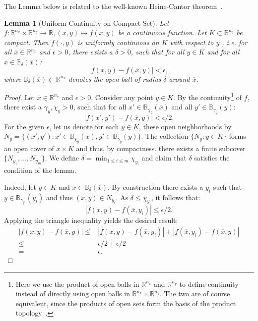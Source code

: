 \documentclass{article}
\newtheorem{lemma}{Lemma}
\newcommand{\R}{\mathbb{R}}
\newcommand{\B}{\mathbb{B}}
\begin{document}
The Lemma below is related to the well-known Heine-Cantor theorem~\citep{Heine1872Die}.
\begin{lemma}[Uniform Continuity on Compact Set]
    \label{lem:uniformcont}
    Let $f:\R^{n_x}\times \R^{n_y} \to \R, (x,y)\mapsto f(x,y)$ be a continuous function. Let $K\subset \R^{n_y}$ be compact. Then $f(\cdot,y)$ is uniformly continuous on $K$ with respect to $y$ , i.e. for all $\overline{x} \in \R^{n_x}$ and $\epsilon>0$, there exists a $\delta>0$, such that for all $y\in K$ and for all $x\in \mathbb{B}_\delta(\overline{x})$:
    \[
    |f(x,y)-f(\overline{x},y)|<\epsilon,
    \]
    where $\mathbb{B}_\delta(\overline{x})\subset \R^{n_x}$ denotes the open ball of radius $\delta$ around $\overline{x}$.
\end{lemma}
\begin{proof}
    Let $\overline{x}\in \R^{n_x}$ and $\epsilon>0$. Consider any point $y\in K$. By the continuity\footnote{Here we use the product of open balls in $\R^{n_x}$ and $\R^{n_y}$ to define continuity instead of directly using open balls in $\R^{n_x}\times \R^{n_y}$. The two are of course equivalent, since the products of open sets form the basis of the product topology~\citep{Hatcher2005Notes}.} of $f$, there exist a $\gamma_y,\chi_y>0$, such that for all $x'\in \mathbb{B}_{\chi_y}(\overline{x})$ and all $y'\in \mathbb{B}_{\gamma_y}(y)$:
    \[
        |f(x',y')-f(\overline{x},y)|<\epsilon/2.
    \]
    For the given $\epsilon$, let us denote for each $y\in K$, these open neighborhoods by $N_y= \{(x',y'): x'\in \mathbb{B}_{\chi_y}(\overline{x}), y'\in \mathbb{B}_{\gamma_y}(y)\}$. The collection $\{N_y: y\in K\}$ forms an open cover of $\overline{x} \times K$ and thus, by compactness. there exists a finite subcover $\{N_{y_1},\dots,N_{y_m}\}$. We define $\delta = \min_{1\leq i \leq m} \chi_{y_i}$ and claim that $\delta$ satisfies the condition of the lemma.

    Indeed, let $y\in K$ and $x\in \mathbb{B}_\delta(\overline{x})$. By construction there exists a $y_i$ such that $y \in \B_{\gamma_{y_i}}(y_i)$ and thus $(x,y)\in N_{y_i}$. As $\delta\leq \chi_{y_i}$, it follows that:
    \[
    | f(x,y)-f(\overline{x},y_i) | \leq \epsilon/2.
    \]
    Applying the triangle inequality yields the desired result:
    \begin{align*}
        | f(x,y)-f(\overline{x},y) | \leq & | f(x,y)-f(\overline{x},y_i) | + | f(\overline{x},y_i)-f(\overline{x},y) |\\
        \leq & \epsilon/2 + \epsilon/2 \\
        =& \epsilon.
    \end{align*}
\end{proof}
\end{document}
